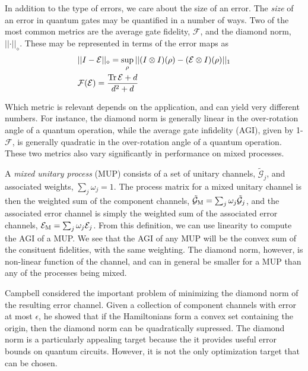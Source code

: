 \documentclass[aps,nofootinbib,pra,notitlepage,twocolumn]{revtex4-1}
\newcommand{\tr}{{\rm Tr\thinspace}}
\newcommand{\actual}{\ensuremath{\tilde{\mathcal{G}}}}
\newcommand{\error}{\ensuremath{{\mathcal{E}}}}
\begin{document}
In addition to the type of errors, we care about the size of an error. The \emph{size} of an error in quantum gates may  be quantified in a number of ways. Two of the most common metrics are the average gate fidelity, $\mathcal{F}$, and the diamond norm, $\vert\vert\cdot\vert\vert_\diamond$. These may be represented in terms of the error maps as
\begin{align}
	&\vert\vert I - \error \vert\vert_\diamond = \sup_\rho \vert \vert (I\otimes I)(\rho) - (\error \otimes I)(\rho) \vert\vert_1\\
	&\mathcal{F}(\error) = \frac{\tr{\error} + d}{d^2 + d} 
\end{align}

Which metric is relevant depends on the application, and can yield very different numbers. For instance, the diamond norm is generally linear in the over-rotation angle of a quantum operation, while the average gate infidelity (AGI), given by 1-$\mathcal{F}$, is generally quadratic in the over-rotation angle of a quantum operation. These two metrics also vary significantly in performance on mixed processes.

A \textit{mixed unitary process} (MUP) consists of a set of unitary channels, $\actual_j$, and associated weights, $\sum_j \omega_j = 1$.  The process matrix for a mixed unitary channel is then the weighted sum of the component channels, $\actual_{\rm M} = \sum_j \omega_j \actual_j$, and the associated error channel is simply the weighted sum of the associated error channels, $\error_{\rm M} = \sum_j \omega_j \error_j$. From this definition, we can use linearity to compute the AGI of a MUP. We see that the AGI of any MUP will be the convex sum of the consituent fidelities, with the same weighting. The diamond norm, however, is non-linear function of the channel, and can in general be smaller for a MUP than any of the processes being mixed. 

Campbell\cite{Campbell2017} considered the important problem of minimizing the diamond norm of the resulting error channel. Given a collection of component channels with error at most $\epsilon$, he showed that if the Hamiltonians form a convex set containing the origin, then the diamond norm can be quadratically supressed. The diamond norm is a particularly appealing target because the it provides useful error bounds on quantum circuits. However, it is not the only optimization target that can be chosen. 

\end{document}
